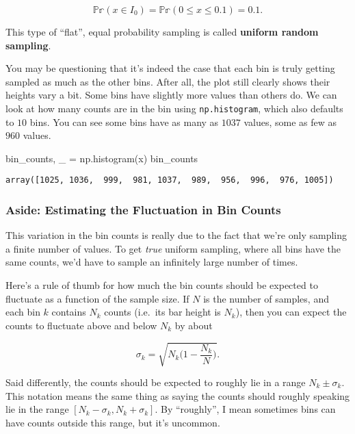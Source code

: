 \documentclass[
  letterpaper,
  DIV=11,
  numbers=noendperiod]{scrreprt}
\newenvironment{Shaded}{\begin{snugshade}}{\end{snugshade}}
\newcommand{\NormalTok}[1]{\textcolor[rgb]{0.00,0.23,0.31}{#1}}
\newcommand{\OperatorTok}[1]{\textcolor[rgb]{0.37,0.37,0.37}{#1}}
\begin{document}
\[\mathbb{Pr}(x \in I_0) = \mathbb{Pr}(0 \leq x \leq 0.1) = 0.1.\]

This type of ``flat'', equal probability sampling is called
\textbf{uniform random sampling}.

You may be questioning that it's indeed the case that each bin is truly
getting sampled as much as the other bins. After all, the plot still
clearly shows their heights vary a bit. Some bins have slightly more
values than others do. We can look at how many counts are in the bin
using \texttt{np.histogram}, which also defaults to \(10\) bins. You can
see some bins have as many as \(1037\) values, some as few as \(960\)
values.

\begin{Shaded}
\begin{Highlighting}[]
\NormalTok{bin\_counts, \_ }\OperatorTok{=}\NormalTok{ np.histogram(x)}
\NormalTok{bin\_counts}
\end{Highlighting}
\end{Shaded}

\begin{verbatim}
array([1025, 1036,  999,  981, 1037,  989,  956,  996,  976, 1005])
\end{verbatim}

\hypertarget{aside-estimating-the-fluctuation-in-bin-counts}{%
\subsubsection{Aside: Estimating the Fluctuation in Bin
Counts}\label{aside-estimating-the-fluctuation-in-bin-counts}}

This variation in the bin counts is really due to the fact that we're
only sampling a finite number of values. To get \emph{true} uniform
sampling, where all bins have the same counts, we'd have to sample an
infinitely large number of times.

Here's a rule of thumb for how much the bin counts should be expected to
fluctuate as a function of the sample size. If \(N\) is the number of
samples, and each bin \(k\) contains \(N_k\) counts (i.e.~its bar height
is \(N_k\)), then you can expect the counts to fluctuate above and below
\(N_k\) by about

\[\sigma_k = \sqrt{N_k\bigg(1 - \frac{N_k}{N}\bigg)}.\]

Said differently, the counts should be expected to roughly lie in a
range \(N_k \pm \sigma_k\). This notation means the same thing as saying
the counts should roughly speaking lie in the range
\([N_k - \sigma_k, N_k + \sigma_k]\). By ``roughly'', I mean sometimes
bins can have counts outside this range, but it's uncommon.
\end{document}
